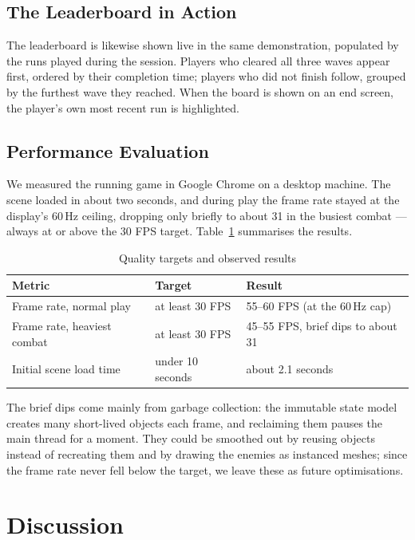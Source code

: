 \documentclass[12pt,a4paper]{report}
\begin{document}
\subsection{The Leaderboard in Action}

The leaderboard is likewise shown live in the same demonstration, populated by
the runs played during the session. Players who cleared all three waves appear
first, ordered by their completion time; players who did not finish follow,
grouped by the furthest wave they reached. When the board is shown on an end
screen, the player's own most recent run is highlighted.



\subsection{Performance Evaluation}

We measured the running game in Google Chrome on a desktop machine. The scene
loaded in about two seconds, and during play the frame rate stayed at the
display's 60\,Hz ceiling, dropping only briefly to about 31 in the busiest
combat --- always at or above the 30 FPS target. Table~\ref{tab:perf}
summarises the results.

\begin{table}[htbp]
\centering
\caption{Quality targets and observed results}
\label{tab:perf}
\begin{tabular}{|p{5.2cm}|p{2.6cm}|p{4.2cm}|}
\hline
Metric & Target & Result \\
\hline
Frame rate, normal play & at least 30 FPS & 55--60 FPS (at the 60\,Hz cap) \\
\hline
Frame rate, heaviest combat & at least 30 FPS & 45--55 FPS, brief dips to about 31 \\
\hline
Initial scene load time & under 10 seconds & about 2.1 seconds \\
\hline
\end{tabular}
\end{table}

The brief dips come mainly from garbage collection: the immutable state model
creates many short-lived objects each frame, and reclaiming them pauses the main
thread for a moment. They could be smoothed out by reusing objects instead of
recreating them and by drawing the enemies as instanced meshes; since the frame
rate never fell below the target, we leave these as future optimisations.

\section{Discussion}
\end{document}
